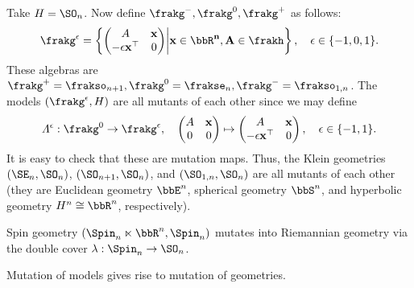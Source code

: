 \begin{example}
    Take $H=\SO_n$. Now define $\frakg^-,\frakg^0,\frakg^+$ as follows:
    \[\frakg^\epsilon=\left\{
        \begin{pmatrix}
            A & \bf{x}\\
            -\epsilon\bf{x}^\top  & 0
        \end{pmatrix}\middle| \bf{x}\in\bbR^n,A\in\frakh
    \right\},\quad \epsilon\in \{-1,0,1\}.\]
    These algebras are $\frakg^+=\frakso_{n+1},\frakg^0=\frakse_n,\frakg^-=\frakso_{1,n}$. The models $(\frakg^\epsilon,H)$ are all mutants of each other since we may define 
    \[\varLambda^\epsilon:\frakg^0\to \frakg^\epsilon,\quad 
    \begin{pmatrix}
        A & \bf{x}\\
        0 & 0
\end{pmatrix}\mapsto 
\begin{pmatrix}
    A & \bf{x}\\
    -\epsilon\bf{x}^\top  & 0
\end{pmatrix},\quad \epsilon\in\{-1,1\}.
    \]
    It is easy to check that these are mutation maps. Thus, the Klein geometries $(\SE_n,\SO_n)$, $(\SO_{n+1},\SO_n)$, and $(\SO_{1,n},\SO_n)$ are all mutants of each other (they are Euclidean geometry $\bbE^n$, spherical geometry $\bbS^n$, and hyperbolic geometry $H^n\cong\bbR^n$, respectively).
\end{example}

\begin{example}
    Spin geometry $(\Spin_{n}\ltimes\bbR^n,\Spin_n)$ mutates into Riemannian geometry via the double cover $\lambda:\Spin_n\to \SO_n$.
\end{example}


Mutation of models gives rise to mutation of geometries.

